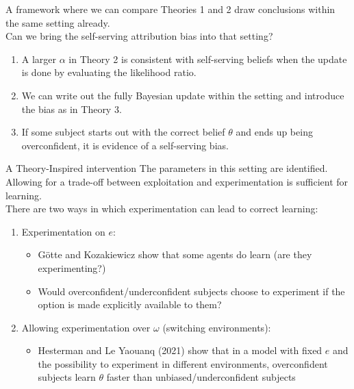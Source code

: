 \documentclass[aspectratio=169]{beamer}
\begin{document}
\begin{frame}{A framework where we can compare}
    Theories 1 and 2 draw conclusions within the same setting already.\\
    \bigskip
    Can we bring the self-serving attribution bias into that setting?\\
    \begin{enumerate}
        \item A larger $\alpha$ in Theory 2 is consistent with self-serving beliefs when the update is done by evaluating the likelihood ratio.
        \item We can write out the fully Bayesian update within the setting and introduce the bias as in Theory 3.
        \item If some subject starts out with the correct belief $\theta$ and ends up being overconfident, it is evidence of a self-serving bias.
    \end{enumerate}
\end{frame}

\begin{frame}{A Theory-Inspired intervention}
    The parameters in this setting are identified. Allowing for a trade-off between exploitation and experimentation is sufficient for learning. \\
    \bigskip
    There are two ways in which experimentation can lead to correct learning:\\
    \begin{enumerate}
        \item Experimentation on $e$:
        \begin{itemize}
            \item Götte and Kozakiewicz show that some agents do learn (are they experimenting?)
            \item Would overconfident/underconfident subjects choose to experiment if the option is made explicitly available to them?
        \end{itemize}
        \bigskip
        \item Allowing experimentation over $\omega$ (switching environments): 
        \begin{itemize}
            \item Hesterman and Le Yaouanq (2021) show that in a model with fixed $e$ and the possibility to experiment in different environments, overconfident subjects learn $\theta$ faster than unbiased/underconfident subjects
        \end{itemize}
    \end{enumerate}
\end{frame}
\end{document}
